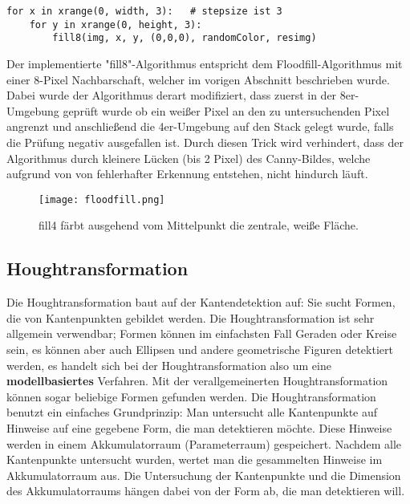 \begin{lstlisting}
for x in xrange(0, width, 3):   # stepsize ist 3
	for y in xrange(0, height, 3):
		fill8(img, x, y, (0,0,0), randomColor, resimg)
\end{lstlisting}

Der implementierte "fill8"-Algorithmus entspricht dem Floodfill-Algorithmus mit einer 8-Pixel Nachbarschaft, welcher im vorigen Abschnitt beschrieben wurde. Dabei wurde der Algorithmus derart modifiziert, dass zuerst in der 8er-Umgebung geprüft wurde ob ein weißer Pixel an den zu untersuchenden Pixel angrenzt und anschließend die 4er-Umgebung auf den Stack gelegt wurde, falls die Prüfung negativ ausgefallen ist. Durch diesen Trick wird verhindert, dass der Algorithmus durch kleinere Lücken (bis 2 Pixel) des Canny-Bildes, welche aufgrund von von fehlerhafter Erkennung entstehen, nicht hindurch läuft.

\begin{figure}[H]
  \begin{center}
    \texttt{[image: floodfill.png]}
    \caption{fill4 färbt ausgehend vom Mittelpunkt die zentrale, weiße Fläche.}
    \label{fig:floodfill}
  \end{center}
\end{figure}

	\subsection {Houghtransformation}
Die Houghtransformation baut auf der Kantendetektion auf: Sie sucht Formen, die von Kantenpunkten gebildet werden.
Die Houghtransformation ist sehr allgemein verwendbar; Formen können im einfachsten Fall Geraden oder Kreise sein, es können aber auch Ellipsen und andere geometrische Figuren detektiert werden, es handelt sich bei der Houghtransformation also um eine \textbf{modellbasiertes} Verfahren.
Mit der verallgemeinerten Houghtransformation können sogar beliebige Formen gefunden werden.
Die Houghtransformation benutzt ein einfaches Grundprinzip: Man untersucht alle Kantenpunkte auf Hinweise auf eine gegebene Form, die man detektieren möchte. Diese Hinweise werden in einem Akkumulatorraum (Parameterraum) gespeichert. Nachdem alle Kantenpunkte untersucht wurden, wertet man die gesammelten Hinweise im Akkumulatorraum aus.
Die Untersuchung der Kantenpunkte und die Dimension des Akkumulatorraums hängen dabei von der Form ab, die man detektieren will.
